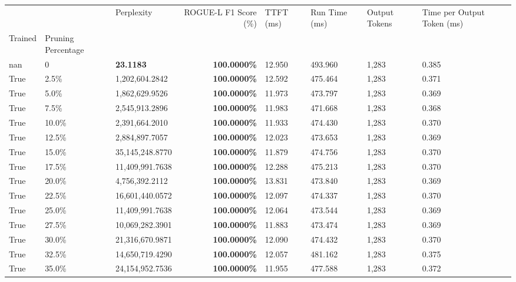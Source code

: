 \begin{table}[H]
\label{tab:evaluation-pipeline-13-trained}
\begin{tabular}{lllrllll}
\toprule
 &  & Perplexity & ROGUE-L F1 Score (\%) & TTFT (ms) & Run Time (ms) & Output Tokens & Time per Output Token (ms) \\
Trained & Pruning Percentage &  &  &  &  &  &  \\
\midrule
nan & 0 & \bfseries 23.1183 & \bfseries 100.0000\% & 12.950 & 493.960 & 1,283 & 0.385 \\
\cline{1-8}
True & 2.5\% & 1,202,604.2842 & \bfseries \color{red} 100.0000\% & 12.592 & 475.464 & 1,283 & 0.371 \\
\cline{1-8}
True & 5.0\% & 1,862,629.9526 & \bfseries \color{red} 100.0000\% & 11.973 & 473.797 & 1,283 & 0.369 \\
\cline{1-8}
True & 7.5\% & 2,545,913.2896 & \bfseries \color{red} 100.0000\% & 11.983 & 471.668 & 1,283 & 0.368 \\
\cline{1-8}
True & 10.0\% & 2,391,664.2010 & \bfseries \color{red} 100.0000\% & 11.933 & 474.430 & 1,283 & 0.370 \\
\cline{1-8}
True & 12.5\% & 2,884,897.7057 & \bfseries \color{red} 100.0000\% & 12.023 & 473.653 & 1,283 & 0.369 \\
\cline{1-8}
True & 15.0\% & 35,145,248.8770 & \bfseries \color{red} 100.0000\% & 11.879 & 474.756 & 1,283 & 0.370 \\
\cline{1-8}
True & 17.5\% & 11,409,991.7638 & \bfseries \color{red} 100.0000\% & 12.288 & 475.213 & 1,283 & 0.370 \\
\cline{1-8}
True & 20.0\% & 4,756,392.2112 & \bfseries \color{red} 100.0000\% & 13.831 & 473.840 & 1,283 & 0.369 \\
\cline{1-8}
True & 22.5\% & 16,601,440.0572 & \bfseries \color{red} 100.0000\% & 12.097 & 474.337 & 1,283 & 0.370 \\
\cline{1-8}
True & 25.0\% & 11,409,991.7638 & \bfseries \color{red} 100.0000\% & 12.064 & 473.544 & 1,283 & 0.369 \\
\cline{1-8}
True & 27.5\% & 10,069,282.3901 & \bfseries \color{red} 100.0000\% & 11.883 & 473.474 & 1,283 & 0.369 \\
\cline{1-8}
True & 30.0\% & 21,316,670.9871 & \bfseries \color{red} 100.0000\% & 12.090 & 474.432 & 1,283 & 0.370 \\
\cline{1-8}
True & 32.5\% & 14,650,719.4290 & \bfseries \color{red} 100.0000\% & 12.057 & 481.162 & 1,283 & 0.375 \\
\cline{1-8}
True & 35.0\% & 24,154,952.7536 & \bfseries \color{red} 100.0000\% & 11.955 & 477.588 & 1,283 & 0.372 \\

\end{tabular}
\end{table}
